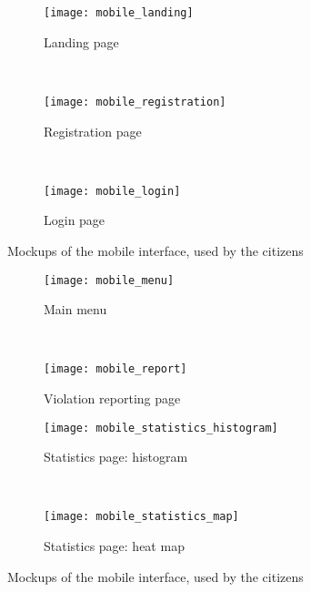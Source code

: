 \begin{figure}[h]
    \centering
    \begin{subfigure}{0.3\textwidth}
        \texttt{[image: mobile\_landing]}
        \caption{Landing page}
    \end{subfigure}
    ~
    \begin{subfigure}{0.3\textwidth}
        \texttt{[image: mobile\_registration]}
        \caption{Registration page}
    \end{subfigure}
    ~
    \begin{subfigure}{0.3\textwidth}
        \texttt{[image: mobile\_login]}
        \caption{Login page}
    \end{subfigure}

    \caption{Mockups of the mobile interface, used by the citizens}
    \label{fig:mockups_mobile}
\end{figure}%
\begin{figure}[ht]\ContinuedFloat
    \centering
    \begin{subfigure}{0.3\textwidth}
        \texttt{[image: mobile\_menu]}
        \caption{Main menu}
    \end{subfigure}
    ~
    \begin{subfigure}{0.3\textwidth}
        \texttt{[image: mobile\_report]}
        \caption{Violation reporting page}
    \end{subfigure}

    \begin{subfigure}{0.3\textwidth}
        \texttt{[image: mobile\_statistics\_histogram]}
        \caption{Statistics page: histogram}
    \end{subfigure}
    ~
    \begin{subfigure}{0.3\textwidth}
        \texttt{[image: mobile\_statistics\_map]}
        \caption{Statistics page: heat map}
    \end{subfigure}
    
    \caption{Mockups of the mobile interface, used by the citizens}
\end{figure}

